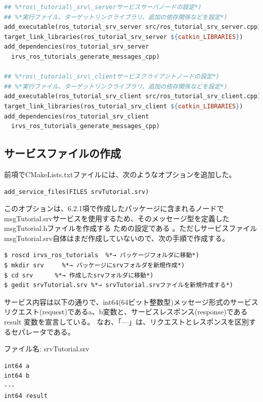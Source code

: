 \begin{lstlisting}[language=make]
## %*ros\_tutorial\_srv\_serverサービスサーバノードの設定*)
## %*実行ファイル、ターゲットリンクライブラリ、追加の依存関係などを設定*)
add_executable(ros_tutorial_srv_server src/ros_tutorial_srv_server.cpp)
target_link_libraries(ros_tutorial_srv_server ${catkin_LIBRARIES})
add_dependencies(ros_tutorial_srv_server
  irvs_ros_tutorials_generate_messages_cpp)

## %*ros\_tutorial\_srv\_clientサービスクライアントノードの設定*)
## %*実行ファイル、ターゲットリンクライブラリ、追加の依存関係などを設定*)
add_executable(ros_tutorial_srv_client src/ros_tutorial_srv_client.cpp)
target_link_libraries(ros_tutorial_srv_client ${catkin_LIBRARIES})
add_dependencies(ros_tutorial_srv_client
  irvs_ros_tutorials_generate_messages_cpp)
\end{lstlisting}

\subsection{サービスファイルの作成}

前項でCMakeLists.txtファイルには、次のようなオプションを追加した。

\begin{lstlisting}[language=make]
add_service_files(FILES srvTutorial.srv)
\end{lstlisting}

このオプションは、6.2.1項で作成したパッケージに含まれるノードでmsgTutorial.srvサービスを使用するため、そのメッセージ型を定義したmsgTutorial.hファイルを作成する ための設定である 。ただしサービスファイルmsgTutorial.srv自体はまだ作成していないので、次の手順で作成する。

\begin{lstlisting}[language=ROS]
$ roscd irvs_ros_tutorials  %*→ パッケージフォルダに移動*)
$ mkdir srv     %*→ パッケージにsrvフォルダを新規作成*)
$ cd srv      %*→ 作成したsrvフォルダに移動*)
$ gedit srvTutorial.srv %*→ srvTutorial.srvファイルを新規作成する*)
\end{lstlisting}

サービス内容は以下の通りで、int64(64ビット整数型)メッセージ形式のサービスリクエスト(request)であるa、b変数と、サービスレスポンス(response)であるresult  変数を宣言している。 なお、「---」は、リクエストとレスポンスを区別するセパレータである。

ファイル名: srvTutorial.srv
\begin{lstlisting}[language=ROS]
int64 a
int64 b
---
int64 result
\end{lstlisting}

